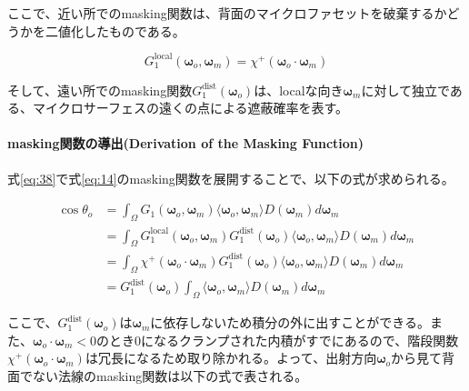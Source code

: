\documentclass[a4j,xelatex,ja=standard]{bxjsarticle}
\begin{document}
ここで、近い所でのmasking関数は、背面のマイクロファセットを破棄するかどうかを二値化したものである。

\begin{equation}
    G_1^{\text{local}}(\boldsymbol{\omega}_o, \boldsymbol{\omega}_m) = \chi^+(\boldsymbol{\omega}_o \cdot \boldsymbol{\omega}_m)
    \label{eq:39}
\end{equation}

そして、遠い所でのmasking関数$G_1^{\text{dist}}(\boldsymbol{\omega}_o)$は、localな向き$\boldsymbol{\omega}_m$に対して独立である、マイクロサーフェスの遠くの点による遮蔽確率を表す。

\paragraph{masking関数の導出(Derivation of the Masking Function)}

式\eqref{eq:38}で式\eqref{eq:14}のmasking関数を展開することで、以下の式が求められる。

\begin{equation}
    \begin{split}
        \cos\theta_o
        &= \int_{\Omega} G_1(\boldsymbol{\omega}_o, \boldsymbol{\omega}_m) \langle \boldsymbol{\omega}_o, \boldsymbol{\omega}_m \rangle D(\boldsymbol{\omega}_m) d\boldsymbol{\omega}_m \\
        &= \int_{\Omega} G_1^{\text{local}}(\boldsymbol{\omega}_o, \boldsymbol{\omega}_m) G_1^{\text{dist}}(\boldsymbol{\omega}_o) \langle \boldsymbol{\omega}_o, \boldsymbol{\omega}_m \rangle D(\boldsymbol{\omega}_m) d\boldsymbol{\omega}_m \\
        &= \int_{\Omega} \chi^+(\boldsymbol{\omega}_o \cdot \boldsymbol{\omega}_m) G_1^{\text{dist}}(\boldsymbol{\omega}_o) \langle \boldsymbol{\omega}_o, \boldsymbol{\omega}_m \rangle D(\boldsymbol{\omega}_m) d\boldsymbol{\omega}_m \\
        &=  G_1^{\text{dist}}(\boldsymbol{\omega}_o) \int_{\Omega} \langle \boldsymbol{\omega}_o, \boldsymbol{\omega}_m \rangle D(\boldsymbol{\omega}_m) d\boldsymbol{\omega}_m
    \end{split}
    \label{eq:40}
\end{equation}

ここで、$G_1^{\text{dist}}(\boldsymbol{\omega}_o)$は$\boldsymbol{\omega}_m$に依存しないため積分の外に出すことができる。また、$\boldsymbol{\omega}_o \cdot \boldsymbol{\omega}_m < 0$のとき$0$になるクランプされた内積がすでにあるので、階段関数$\chi^+(\boldsymbol{\omega}_o \cdot \boldsymbol{\omega}_m)$は冗長になるため取り除かれる。よって、出射方向$\boldsymbol{\omega}_o$から見て背面でない法線のmasking関数は以下の式で表される。
\end{document}
